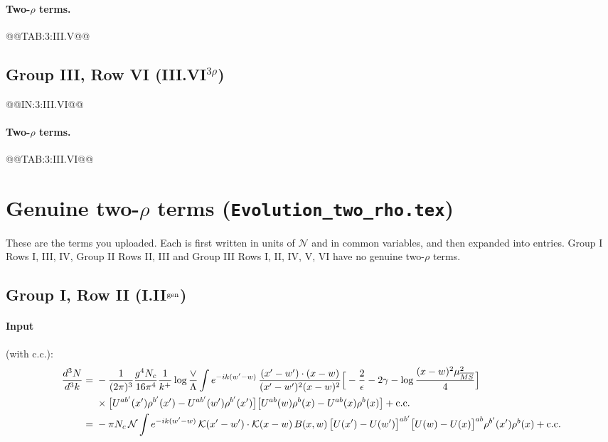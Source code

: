 \documentclass[10pt]{article}
\numberwithin{equation}{section}
\newcommand{\KK}{\mathcal K}
\newcommand{\NN}{\mathcal N}
\begin{document}
\paragraph{Two-$\rho$ terms.}
@@TAB:3:III.V@@

\subsection{Group III, Row VI \texorpdfstring{(III.VI$^{3\rho}$)}{}}\label{src:3:III.VI}
@@IN:3:III.VI@@
\paragraph{Two-$\rho$ terms.}
@@TAB:3:III.VI@@

\section{Genuine two-\texorpdfstring{$\rho$}{rho} terms (\texttt{Evolution\_two\_rho.tex})}\label{sec:genuine}
These are the terms you uploaded. Each is first written in units of $\NN$ and in common variables, and then expanded into entries. Group I Rows I, III, IV, Group II Rows II, III and Group III Rows I, II, IV, V, VI have no genuine two-$\rho$ terms.

\subsection{Group I, Row II \texorpdfstring{(I.II$^{\rm gen}$)}{}}\label{src:g:I.II}
\paragraph{Input} (with c.c.):
\begin{align}
\frac{d^3N}{d^3k}={}&-\frac{1}{(2\pi)^3}\frac{g^4N_c}{16\pi^4}\frac1{k^+}\log\frac\vee\Lambda\int e^{-ik(w'-w)}\,\frac{(x'-w')\cdot(x-w)}{(x'-w')^2(x-w)^2}\Big[-\frac2\epsilon-2\gamma-\log\frac{(x-w)^2\mu^2_{\overline{MS}}}{4}\Big]\notag\\
&\times\big[U^{ab'}(x')\rho^{b'}(x')-U^{ab'}(w')\rho^{b'}(x')\big]\big[U^{ab}(w)\rho^b(x)-U^{ab}(x)\rho^b(x)\big]+{\rm c.c.}\notag\\
={}&-\pi N_c\,\NN\int e^{-ik(w'-w)}\,\KK(x'-w')\cdot\KK(x-w)\,B(x,w)\,\big[U(x')-U(w')\big]^{ab'}\big[U(w)-U(x)\big]^{ab}\rho^{b'}(x')\rho^b(x)+{\rm c.c.}
\end{align}
\end{document}
